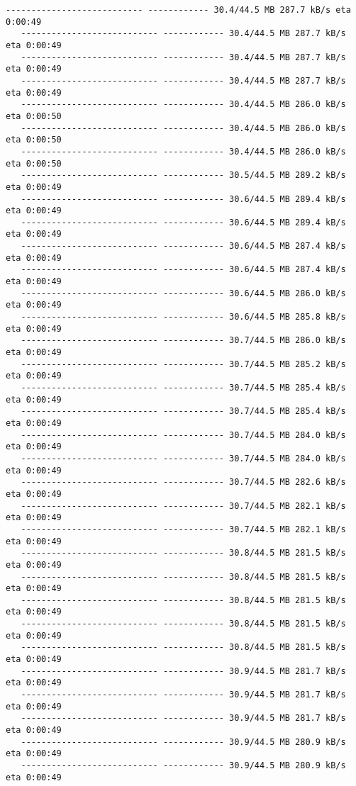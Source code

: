 \documentclass[11pt]{article}
\begin{document}
\begin{Verbatim}[commandchars=\\\{\}]
   --------------------------- ------------ 30.4/44.5 MB 287.7 kB/s eta 0:00:49
   --------------------------- ------------ 30.4/44.5 MB 287.7 kB/s eta 0:00:49
   --------------------------- ------------ 30.4/44.5 MB 287.7 kB/s eta 0:00:49
   --------------------------- ------------ 30.4/44.5 MB 287.7 kB/s eta 0:00:49
   --------------------------- ------------ 30.4/44.5 MB 286.0 kB/s eta 0:00:50
   --------------------------- ------------ 30.4/44.5 MB 286.0 kB/s eta 0:00:50
   --------------------------- ------------ 30.4/44.5 MB 286.0 kB/s eta 0:00:50
   --------------------------- ------------ 30.5/44.5 MB 289.2 kB/s eta 0:00:49
   --------------------------- ------------ 30.6/44.5 MB 289.4 kB/s eta 0:00:49
   --------------------------- ------------ 30.6/44.5 MB 289.4 kB/s eta 0:00:49
   --------------------------- ------------ 30.6/44.5 MB 287.4 kB/s eta 0:00:49
   --------------------------- ------------ 30.6/44.5 MB 287.4 kB/s eta 0:00:49
   --------------------------- ------------ 30.6/44.5 MB 286.0 kB/s eta 0:00:49
   --------------------------- ------------ 30.6/44.5 MB 285.8 kB/s eta 0:00:49
   --------------------------- ------------ 30.7/44.5 MB 286.0 kB/s eta 0:00:49
   --------------------------- ------------ 30.7/44.5 MB 285.2 kB/s eta 0:00:49
   --------------------------- ------------ 30.7/44.5 MB 285.4 kB/s eta 0:00:49
   --------------------------- ------------ 30.7/44.5 MB 285.4 kB/s eta 0:00:49
   --------------------------- ------------ 30.7/44.5 MB 284.0 kB/s eta 0:00:49
   --------------------------- ------------ 30.7/44.5 MB 284.0 kB/s eta 0:00:49
   --------------------------- ------------ 30.7/44.5 MB 282.6 kB/s eta 0:00:49
   --------------------------- ------------ 30.7/44.5 MB 282.1 kB/s eta 0:00:49
   --------------------------- ------------ 30.7/44.5 MB 282.1 kB/s eta 0:00:49
   --------------------------- ------------ 30.8/44.5 MB 281.5 kB/s eta 0:00:49
   --------------------------- ------------ 30.8/44.5 MB 281.5 kB/s eta 0:00:49
   --------------------------- ------------ 30.8/44.5 MB 281.5 kB/s eta 0:00:49
   --------------------------- ------------ 30.8/44.5 MB 281.5 kB/s eta 0:00:49
   --------------------------- ------------ 30.8/44.5 MB 281.5 kB/s eta 0:00:49
   --------------------------- ------------ 30.9/44.5 MB 281.7 kB/s eta 0:00:49
   --------------------------- ------------ 30.9/44.5 MB 281.7 kB/s eta 0:00:49
   --------------------------- ------------ 30.9/44.5 MB 281.7 kB/s eta 0:00:49
   --------------------------- ------------ 30.9/44.5 MB 280.9 kB/s eta 0:00:49
   --------------------------- ------------ 30.9/44.5 MB 280.9 kB/s eta 0:00:49

\end{Verbatim}
\end{document}
